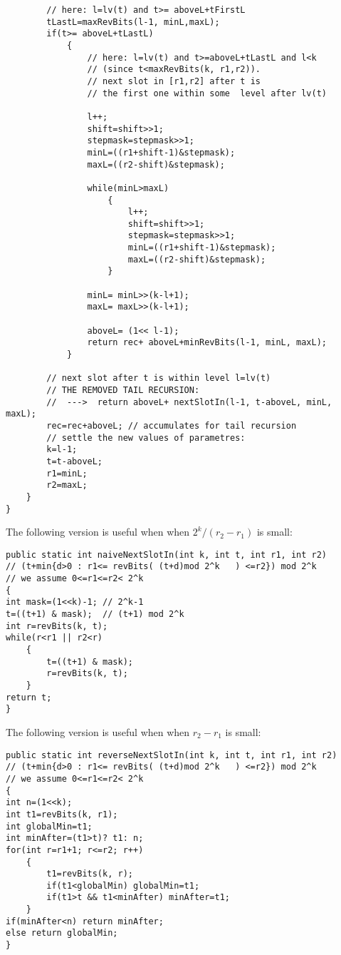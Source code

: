 \begin{verbatim}
        // here: l=lv(t) and t>= aboveL+tFirstL
        tLastL=maxRevBits(l-1, minL,maxL);
        if(t>= aboveL+tLastL)
            {
                // here: l=lv(t) and t>=aboveL+tLastL and l<k 
                // (since t<maxRevBits(k, r1,r2)).
                // next slot in [r1,r2] after t is 
                // the first one within some  level after lv(t)

                l++;
                shift=shift>>1;
                stepmask=stepmask>>1;
                minL=((r1+shift-1)&stepmask);
                maxL=((r2-shift)&stepmask);

                while(minL>maxL)
                    {
                        l++;
                        shift=shift>>1;
                        stepmask=stepmask>>1;
                        minL=((r1+shift-1)&stepmask);
                        maxL=((r2-shift)&stepmask);
                    }

                minL= minL>>(k-l+1);
                maxL= maxL>>(k-l+1);

                aboveL= (1<< l-1);
                return rec+ aboveL+minRevBits(l-1, minL, maxL);
            }

        // next slot after t is within level l=lv(t)
        // THE REMOVED TAIL RECURSION:
        //  --->  return aboveL+ nextSlotIn(l-1, t-aboveL, minL, maxL); 
        rec=rec+aboveL; // accumulates for tail recursion
        // settle the new values of parametres:
        k=l-1;
        t=t-aboveL;
        r1=minL;
        r2=maxL;
    }
}
\end{verbatim}
The following  version is useful when when $2^k/(r_2-r_1)$ is small:
\begin{verbatim}
public static int naiveNextSlotIn(int k, int t, int r1, int r2)
// (t+min{d>0 : r1<= revBits( (t+d)mod 2^k   ) <=r2}) mod 2^k 
// we assume 0<=r1<=r2< 2^k 
{
int mask=(1<<k)-1; // 2^k-1 
t=((t+1) & mask);  // (t+1) mod 2^k
int r=revBits(k, t);
while(r<r1 || r2<r)
    {
        t=((t+1) & mask);
        r=revBits(k, t);
    }
return t;
}
\end{verbatim}
The following  version is useful when when $r_2-r_1$ is small:
\begin{verbatim}
public static int reverseNextSlotIn(int k, int t, int r1, int r2)
// (t+min{d>0 : r1<= revBits( (t+d)mod 2^k   ) <=r2}) mod 2^k 
// we assume 0<=r1<=r2< 2^k 
{
int n=(1<<k);
int t1=revBits(k, r1);
int globalMin=t1;
int minAfter=(t1>t)? t1: n;
for(int r=r1+1; r<=r2; r++)
    {
        t1=revBits(k, r);
        if(t1<globalMin) globalMin=t1;
        if(t1>t && t1<minAfter) minAfter=t1;
    }
if(minAfter<n) return minAfter;
else return globalMin; 
}
\end{verbatim}


